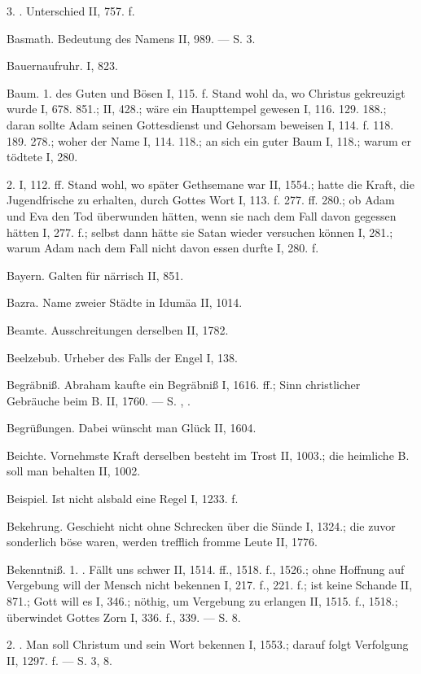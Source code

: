 3. . Unterschied II, 757. f.

Basmath. Bedeutung des Namens II, 989. — S.  3.

Bauernaufruhr. I, 823.

Baum. 1.  des Guten und Bösen I, 115. f. Stand wohl da, wo Christus gekreuzigt wurde I, 678. 851.; II, 428.; wäre ein Haupttempel gewesen I, 116. 129. 188.; daran sollte Adam seinen Gottesdienst und Gehorsam beweisen I, 114. f. 118. 189. 278.; woher der Name I, 114. 118.; an sich ein guter Baum I, 118.; warum er tödtete I, 280.

2.  I, 112. ff. Stand wohl, wo später Gethsemane war II, 1554.; hatte die Kraft, die Jugendfrische zu erhalten, durch Gottes Wort I, 113. f. 277. ff. 280.; ob Adam und Eva den Tod überwunden hätten, wenn sie nach dem Fall davon gegessen hätten I, 277. f.; selbst dann hätte sie Satan wieder versuchen können I, 281.; warum Adam nach dem Fall nicht davon essen durfte I, 280. f.

Bayern. Galten für närrisch II, 851.

Bazra. Name zweier Städte in Idumäa II, 1014.

Beamte. Ausschreitungen derselben II, 1782.

Beelzebub. Urheber des Falls der Engel I, 138.

Begräbniß. Abraham kaufte ein Begräbniß I, 1616. ff.; Sinn christlicher Gebräuche beim B. II, 1760. — S. , .

Begrüßungen. Dabei wünscht man Glück II, 1604.

Beichte. Vornehmste Kraft derselben besteht im Trost II, 1003.; die heimliche B. soll man behalten II, 1002.

Beispiel. Ist nicht alsbald eine Regel I, 1233. f.

Bekehrung. Geschieht nicht ohne Schrecken über die Sünde I, 1324.; die zuvor sonderlich böse waren, werden trefflich fromme Leute II, 1776.

Bekenntniß. 1. . Fällt uns schwer II, 1514. ff., 1518. f., 1526.; ohne Hoffnung auf Vergebung will der Mensch nicht bekennen I, 217. f., 221. f.; ist keine Schande II, 871.; Gott will es I, 346.; nöthig, um Vergebung zu erlangen II, 1515. f., 1518.; überwindet Gottes Zorn I, 336. f., 339. — S.  8.

2. . Man soll Christum und sein Wort bekennen I, 1553.; darauf folgt Verfolgung II, 1297. f. — S.  3,  8.

